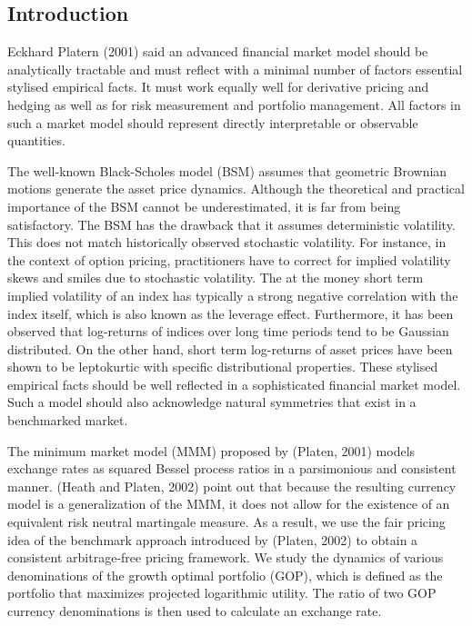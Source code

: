 \documentclass[a4 paper, 12pt]{report}
\theoremstyle{plain}
\begin{document}
\subsection{Introduction}
\noindent
\par Eckhard Platern (2001) said an advanced financial market model should be analytically
tractable and must reflect with a minimal number of factors essential stylised empirical
facts. It must work equally well for derivative pricing and hedging as well as for risk
measurement and portfolio management. All factors in such a market model should
represent directly interpretable or observable quantities.\\
\par The well-known Black-Scholes model (BSM) assumes that geometric Brownian
motions generate the asset price dynamics. Although the theoretical and practical
importance of the BSM cannot be underestimated, it is far from being satisfactory. The
BSM has the drawback that it assumes deterministic volatility. This does not match
historically observed stochastic volatility. For instance, in the context of option pricing,
practitioners have to correct for implied volatility skews and smiles due to stochastic
volatility. The at the money short term implied volatility of an index has typically a strong
negative correlation with the index itself, which is also known as the leverage effect.
Furthermore, it has been observed that log-returns of indices over long time periods tend
to be Gaussian distributed. On the other hand, short term log-returns of asset prices have
been shown to be leptokurtic with specific distributional properties. These stylised
empirical facts should be well reflected in a sophisticated financial market model. Such a
model should also acknowledge natural symmetries that exist in a benchmarked market.\\
\par The minimum market model (MMM) proposed by (Platen, 2001) models exchange
rates as squared Bessel process ratios in a parsimonious and consistent manner. (Heath
and Platen, 2002) point out that because the resulting currency model is a generalization
of the MMM, it does not allow for the existence of an equivalent risk neutral martingale
measure. As a result, we use the fair pricing idea of the benchmark approach introduced
by (Platen, 2002) to obtain a consistent arbitrage-free pricing framework. We study the
dynamics of various denominations of the growth optimal portfolio (GOP), which is
defined as the portfolio that maximizes projected logarithmic utility. The ratio of two
GOP currency denominations is then used to calculate an exchange rate.
\end{document}
